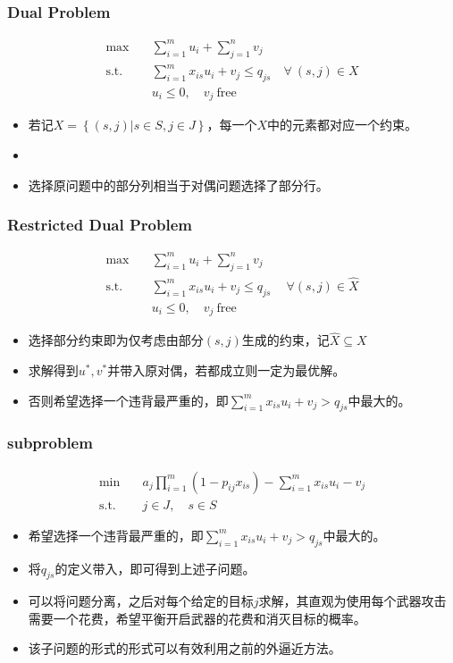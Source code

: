 \documentclass[CJK,10pt]{beamer}
\newcommand{\sumFromTo}[3]{\ensuremath{\sum_{#1}^{#2} #3}}
\newcommand{\optimalProblem}[3]
{\begin{align*}
    #1 \quad &#2 \\
    \mathrm{s. t.}\quad&#3
\end{align*}}
\begin{document}
\begin{frame}
    \frametitle{Dual Problem}
    
    \optimalProblem{\max}{\sumFromTo{i=1}{m}{u_i} + \sumFromTo{j=1}{n}{v_j}\tag{CG-Dual}}{\sumFromTo{i=1}{m}{x_{is}u_i}+ v_j \leq q_{js}\quad \forall ~(s,j) \in X\\ &u_i \leq 0,\quad v_j\ \mathrm{free}}
    \begin{itemize}
        \item 若记$X = \left\{(s,j) | s\in S , j \in J \right\}$，每一个$X$中的元素都对应一个约束。
        \item \item 选择原问题中的部分列相当于对偶问题选择了部分行。
    \end{itemize}
\end{frame}

\begin{frame}
    \frametitle{Restricted Dual Problem}
    
    \optimalProblem{\max}{\sumFromTo{i=1}{m}{u_i} + \sumFromTo{j=1}{n}{v_j}\tag{CG-Dual-R}}{\sumFromTo{i=1}{m}{x_{is}u_i}+ v_j \leq q_{js}\quad ~\forall (s,j) \in \hat{X} \\ &u_i \leq 0,\quad v_j\ \mathrm{free}}
    \begin{itemize}
        
        \item 选择部分约束即为仅考虑由部分$(s,j)$生成的约束，记$\hat{X} \subseteq X$
        \item 求解得到$u^*, v^*$并带入原对偶，若都成立则一定为最优解。
        \item 否则希望选择一个违背最严重的，即$\sumFromTo{i=1}{m}{x_{is}u_i}+ v_j > q_{js}$中最大的。
    \end{itemize}
\end{frame}

\begin{frame}
    \frametitle{subproblem}
    \optimalProblem{\min}{a_j \prod_{i=1}^{m}{(1-p_{ij}x_{is})} -\sumFromTo{i=1}{m}{x_{is}}u_i - v_j}{j \in J,\quad s \in S\tag{CG-sub}}
    \begin{itemize}
        \item 希望选择一个违背最严重的，即$\sumFromTo{i=1}{m}{x_{is}u_i}+ v_j > q_{js}$中最大的。
        \item 将$q_{js}$的定义带入，即可得到上述子问题。
        \item 可以将问题分离，之后对每个给定的目标$j$求解，其直观为使用每个武器攻击需要一个花费，希望平衡开启武器的花费和消灭目标的概率。
        \item 该子问题的形式的形式可以有效利用之前的外逼近方法。
    \end{itemize}
\end{frame}
\end{document}
